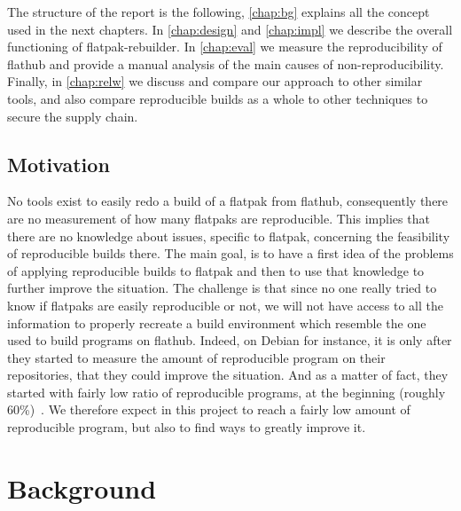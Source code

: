 \documentclass[a4paper,11pt,oneside]{report}
\theoremstyle{definition}
\newcommand{\sysname}{flatpak-rebuilder\xspace}
\newcommand{\rb}{reproducible builds\xspace}
\newcommand{\fp}{flatpak\xspace}
\newcommand{\fh}{flathub\xspace}
\begin{document}
The structure of the report is the following, \autoref{chap:bg} explains all
the concept used in the next chapters. In \autoref{chap:design} and
\autoref{chap:impl} we describe the overall functioning of \sysname. In
\autoref{chap:eval} we measure the reproducibility of \fh and provide a manual
analysis of the main causes of non-reproducibility. Finally, in
\autoref{chap:relw} we discuss and compare our approach to other similar tools,
and also compare \rb as a whole to other techniques to secure the supply chain.

\section{Motivation}
No tools exist to easily redo a build of a \fp from \fh, consequently there are
no measurement of how many flatpaks are reproducible. This implies that there
are no knowledge about issues, specific to \fp, concerning the feasibility of
\rb there. The main goal, is to have a first idea of the problems of applying
\rb to \fp and then to use that knowledge to further improve the situation. The
challenge is that since no one really tried to know if flatpaks are easily
reproducible or not, we will not have access to all the information to properly
recreate a build environment which resemble the one used to build programs on
\fh. Indeed, on Debian for instance, it is only after they started to measure
the amount of reproducible program on their repositories, that they could
improve the situation. And as a matter of fact, they started with fairly low
ratio of reproducible programs, at the beginning (roughly
60\%)~\cite{debian:repro}. We therefore expect in this project to reach a
fairly low amount of reproducible program, but also to find ways to greatly
improve it.


\chapter{Background}
\label{chap:bg}
\end{document}
